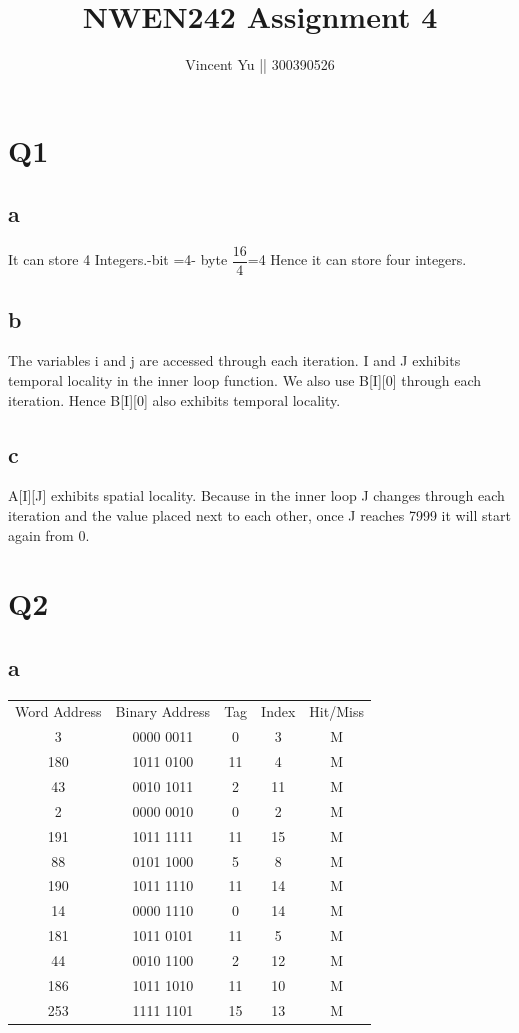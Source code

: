 \documentclass[]{article}
\title{NWEN242 Assignment 4}
\author{Vincent Yu || 300390526}
\begin{document}
\maketitle
\section*{Q1}
\subsection*{a}
It can store 4 Integers.-bit =4- byte\newline
$\dfrac{16}{4}$=4\newline
Hence it can store four integers.\newline
\subsection*{b}
The variables i and j are accessed through each iteration. I and J exhibits temporal locality in the inner loop function. We also use B[I][0] through each iteration. Hence B[I][0] also exhibits temporal locality.\newline 
\subsection*{c}
A[I][J] exhibits spatial locality. Because in the inner loop J changes through each iteration and the value placed next to each other, once J reaches 7999 it will start again from 0. \newline


\section*{Q2}
\subsection*{a}
\begin{center}
	\begin{tabular}{ c c c c c   }
		Word Address & Binary Address & Tag & Index & Hit/Miss\\
		3 & 0000 0011 &  0 & 3 & M\\
		180 & 1011 0100 & 11 & 4 & M\\
		43 & 0010 1011 & 2 & 11 & M\\
		2 & 0000 0010 & 0 & 2 & M\\
		191 & 1011 1111 & 11 & 15 & M\\
		88 & 0101 1000 & 5 & 8 & M\\
		190 & 1011 1110 & 11 & 14 & M\\
		14 & 0000 1110 & 0 & 14 & M\\
		181 & 1011 0101 & 11 & 5 & M\\
		44 & 0010 1100 & 2 & 12 & M\\
		186 & 1011 1010 & 11 & 10 & M\\
		253 & 1111 1101 & 15 & 13 & M\\
	\end{tabular}
\end{center}
\end{document}
